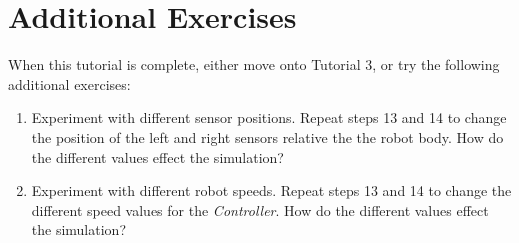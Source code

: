 \documentclass[11pt,a4paper]{../tutorial}
\begin{document}
\section{Additional Exercises}

When this tutorial is complete, either move onto Tutorial 3, or try the following additional exercises:

\begin{enumerate}
  \item Experiment with different sensor positions. Repeat steps 13 and 14 to change the position of the left and right sensors relative the the robot body. How do the different values effect the simulation?
  \item Experiment with different robot speeds. Repeat steps 13 and 14 to change the different speed values for the \emph{Controller}. How do the different values effect the simulation?
\end{enumerate}
\end{document}
